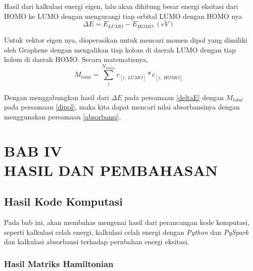 \documentclass[12pt,a4paper]{report}
\begin{document}
	Hasil dari kalkulasi energi eigen, lalu akan dihitung besar energi eksitasi dari HOMO ke LUMO dengan mengurangi tiap orbital LUMO dengan HOMO nya
	\begin{equation}
	\label{deltaE}
	\Delta E = E_{LUMO} - E_{HOMO} \ (eV)
	\end{equation}
	
	Untuk vektor eigen nya, dioperasikan untuk mencari momen dipol yang dimiliki oleh Graphene dengan mengalikan tiap kolom di daerah LUMO dengan tiap kolom di daerah HOMO. Secara matematisnya,
	\begin{equation}
	\label{dipol}
	M_{total} = \sum\limits_{i}^{N_{atoms}} {c_{[i,\ LUMO]}}*{c_{[i,\ HOMO]}}
	\end{equation}
	
	Dengan menggabungkan hasil dari $\Delta E$ pada persamaan \eqref{deltaE} dengan $M_{total}$ pada persamaan \eqref{dipol}, maka kita dapat mencari nilai absorbansinya dengan menggunakan persamaan \eqref{absorbansi}.
	
\chapter*{BAB IV \\ HASIL DAN PEMBAHASAN}
\setcounter{chapter}{4}
\setcounter{section}{0}
\setcounter{figure}{0}
\setcounter{equation}{0}
\thispagestyle{myplain}

\section{Hasil Kode Komputasi}

Pada bab ini, akan membahas mengenai hasil dari perancangan kode komputasi, seperti kalkulasi celah energi, kalkulasi celah energi dengan \textit{Python} dan \textit{PySpark} dan kalkulasi absorbansi terhadap perubahan energi eksitasi.

\subsection{Hasil Matriks Hamiltonian}
\end{document}
